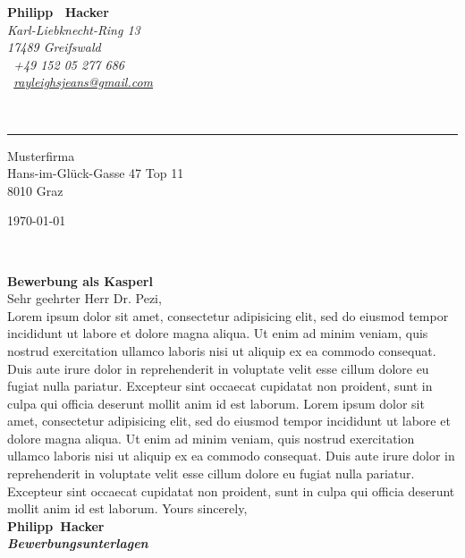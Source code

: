 \documentclass[11pt,a4paper]{article}
\def\firstname{Philipp}
\def\familyname{Hacker}
\begin{document}
	\sffamily
	\hfill%
	\begin{minipage}[t]{.6\textwidth}
		\raggedleft%
		{\bfseries {\color{firstnamecolor}\firstname}~%
			{\color{familynamecolor}\familyname}}\\[.35ex]
		\small\itshape%
		Karl-Liebknecht-Ring 13\\
		17489 Greifswald\\[.35ex]
		\Mobilefone~+49 152 05 277 686\\
		\Letter~\href{mailto:rayleighsjeans@gmail.com}%
			{rayleighsjeans@gmail.com}
	\end{minipage}\\[0.5em]
%
	{\color{firstnamecolor}\rule{\textwidth}{.25ex}}
%
	\begin{minipage}[t]{.4\textwidth}
		\raggedright%
			\vspace*{1em}
			Musterfirma\\[.35ex]
		\small%
		Hans-im-Glück-Gasse 47 Top 11\\
		8010 Graz
	\end{minipage}
%
	\hfill
%
	\begin{minipage}[t]{.4\textwidth}
		\raggedleft%
		\today
	\end{minipage}\\[1em]
	\raggedright%
	
	{\bfseries \color{familynamecolor}Bewerbung als Kasperl}\\[1.5em]
	
	Sehr geehrter Herr Dr. Pezi,\\[0.5cm]
%			
		Lorem ipsum dolor sit amet, consectetur adipisicing elit, sed do eiusmod tempor incididunt ut labore et dolore magna aliqua. Ut enim ad minim veniam, quis nostrud exercitation ullamco laboris nisi ut aliquip ex ea commodo consequat. Duis aute irure dolor in reprehenderit in voluptate velit esse cillum dolore eu fugiat nulla pariatur. Excepteur sint occaecat cupidatat non proident, sunt in culpa qui officia deserunt mollit anim id est laborum. Lorem ipsum dolor sit amet, consectetur adipisicing elit, sed do eiusmod tempor incididunt ut labore et dolore magna aliqua. Ut enim ad minim veniam, quis nostrud exercitation ullamco laboris nisi ut aliquip ex ea commodo consequat. Duis aute irure dolor in reprehenderit in voluptate velit esse cillum dolore eu fugiat nulla pariatur. Excepteur sint occaecat cupidatat non proident, sunt in culpa qui officia deserunt mollit anim id est laborum.
%	  
		Yours sincerely,\\[0.5cm]
%
	{\bfseries \firstname~\familyname}\\
%
	\vfill%
	{\slshape \bfseries Bewerbungsunterlagen}\\
\end{document}
